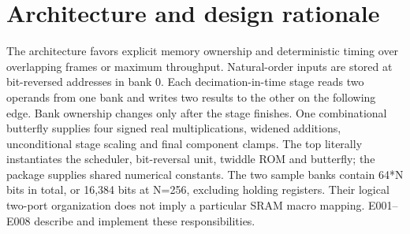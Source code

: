 \documentclass[11pt,a4paper]{article}
\begin{document}
\renewcommand{\abstractname}{\textcolor{vulcanblue}{Abstract}}\begin{abstract}\noindent BILLET-T1 implements a forward complex radix-2 FFT with signed 16-bit Q1.15 input and output,\allowbreak{} natural-order streaming interfaces,\allowbreak{} deterministic floor quantization and nominal 1/\allowbreak{}N normalization. The default transform length is 256; supported lengths are powers of two from 2 through 256. The delivered product is technology-independent RTL IP for integration into a larger digital system,\allowbreak{} not a fabricated or physically signed-off chip. A single reused butterfly operates on two ping-pong sample banks under an explicit synchronous READ/\allowbreak{}WRITE schedule. Independent verification at N=\allowbreak{}2,\allowbreak{}16,\allowbreak{}64,\allowbreak{}256 compared 9,\allowbreak{}454 accepted complex outputs against a separately authored integer oracle with zero scalar mismatches. Every designated rail-safe quality frame met cosine similarity >=\allowbreak{}0.999 and SQNR >=\allowbreak{}30 dB against a direct floating-point DFT. Four functional mutations were detected,\allowbreak{} and generic synthesis reported zero latches at all four required sizes. These results are supported by E014–E016.\par{}\end{abstract}\vspace{2pt}

\section{Architecture and design rationale}

The architecture favors explicit memory ownership and deterministic timing over overlapping frames or maximum throughput. Natural-order inputs are stored at bit-reversed addresses in bank 0. Each decimation-in-time stage reads two operands from one bank and writes two results to the other on the following edge. Bank ownership changes only after the stage finishes. One combinational butterfly supplies four signed real multiplications,\allowbreak{} widened additions,\allowbreak{} unconditional stage scaling and final component clamps. The top literally instantiates the scheduler,\allowbreak{} bit-reversal unit,\allowbreak{} twiddle ROM and butterfly; the package supplies shared numerical constants. The two sample banks contain 64*\allowbreak{}N bits in total,\allowbreak{} or 16,\allowbreak{}384 bits at N=\allowbreak{}256,\allowbreak{} excluding holding registers. Their logical two-port organization does not imply a particular SRAM macro mapping. E001–E008 describe and implement these responsibilities.
\end{document}
